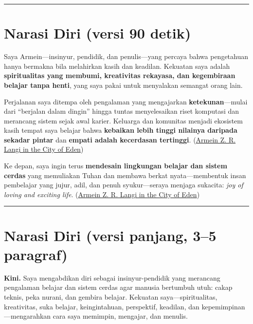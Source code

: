\documentclass[
  letterpaper,
  DIV=11,
  numbers=noendperiod]{scrreprt}
\begin{document}
\begin{center}\rule{0.5\linewidth}{0.5pt}\end{center}

\section{Narasi Diri (versi 90 detik)}\label{narasi-diri-versi-90-detik}

Saya Armein---insinyur, pendidik, dan penulis---yang percaya bahwa
pengetahuan hanya bermakna bila melahirkan kasih dan keadilan. Kekuatan
saya adalah \textbf{spiritualitas yang membumi, kreativitas rekayasa,
dan kegembiraan belajar tanpa henti}, yang saya pakai untuk menyalakan
semangat orang lain.

Perjalanan saya ditempa oleh pengalaman yang mengajarkan
\textbf{ketekunan}---mulai dari ``berjalan dalam dingin'' hingga tuntas
menyelesaikan riset komputasi dan merancang sistem sejak awal karier.
Keluarga dan komunitas menjadi ekosistem kasih tempat saya belajar bahwa
\textbf{kebaikan lebih tinggi nilainya daripada sekadar pintar} dan
\textbf{empati adalah kecerdasan tertinggi}.
(\href{https://ii-2100.github.io/all-about-me/My_Stories_for_You/index.html}{Armein
Z. R. Langi in the City of Eden})

Ke depan, saya ingin terus \textbf{mendesain lingkungan belajar dan
sistem cerdas} yang memuliakan Tuhan dan membawa berkat
nyata---membentuk insan pembelajar yang jujur, adil, dan penuh
syukur---seraya menjaga sukacita: \emph{joy of loving and exciting
life}.
(\href{https://ii-2100.github.io/all-about-me/My_Stories_for_You/index.html}{Armein
Z. R. Langi in the City of Eden})

\begin{center}\rule{0.5\linewidth}{0.5pt}\end{center}

\section{Narasi Diri (versi panjang, 3--5
paragraf)}\label{narasi-diri-versi-panjang-35-paragraf}

\textbf{Kini.} Saya mengabdikan diri sebagai insinyur-pendidik yang
merancang pengalaman belajar dan sistem cerdas agar manusia bertumbuh
utuh: cakap teknis, peka nurani, dan gembira belajar. Kekuatan
saya---spiritualitas, kreativitas, suka belajar, keingintahuan,
perspektif, keadilan, dan kepemimpinan---mengarahkan cara saya memimpin,
mengajar, dan menulis.
\end{document}
